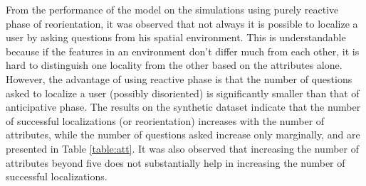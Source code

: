 \documentclass{iitkthesis}
\begin{document}
From the performance of the model on the simulations using purely reactive phase of reorientation, it was observed that not always it is possible to localize a user by asking questions from his spatial environment. This is understandable because if the features in an environment don't differ much from each other, it is hard to distinguish one locality from the other based on the attributes alone. However, the advantage of using reactive phase is that the number of questions asked to localize a user (possibly disoriented) is significantly smaller than that of anticipative phase. The results on the synthetic dataset indicate that the number of successful localizations (or reorientation) increases with the number of attributes, while the number of questions asked increase only marginally, and are presented in Table \ref{table:att}. It was also observed that increasing the number of attributes beyond five does not substantially help in increasing the number of successful localizations. 
\end{document}
